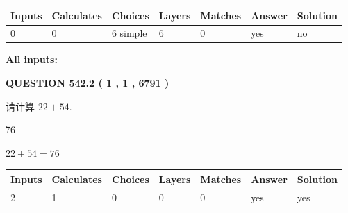 \documentclass{ctexart}
\begin{document}
   
\noindent\begin{tabular}{|l|l|l|l|l|l|l|}
 \hline
Inputs & Calculates & Choices & Layers & Matches & Answer & Solution \\ \hline
 0  & 
 0  & 
 6
  simple  
  & 
 6  & 
 0  & 
  yes & 
  no 
  \\ \hline
 \end{tabular}
   
   
   
   
\noindent{}
   
   
   
   
\noindent\vspace{0.1in}\hspace{-0.08in} {\textbf{\Large{All inputs: }}}
   
   
  
\vspace{0.2in}
  
{\textbf{\Large{QUESTION
542.2 
 ( 1 , 1 , 6791 )
}}}
  
  
 
请计算 $ %
22 +  %
54 $.
 
 
 
\noindent{}
 
 

76
 
 
\noindent{}
 
 

 
 
 
\noindent{}
 
 

$ %
22 +  %
54=   %
76$
 
 
\noindent{}
 
 

 
   
   
   
   
\noindent\begin{tabular}{|l|l|l|l|l|l|l|}
 \hline
Inputs & Calculates & Choices & Layers & Matches & Answer & Solution \\ \hline
 2  & 
 1  & 
 0
  & 
 0  & 
 0  & 
  yes & 
  yes 
  \\ \hline
 \end{tabular}
   
\end{document}
